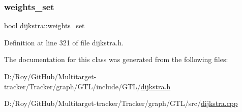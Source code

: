 \subsubsection{\texorpdfstring{weights\+\_\+set}{weights\_set}}
{\footnotesize\ttfamily bool dijkstra\+::weights\+\_\+set\hspace{0.3cm}{\ttfamily [private]}}



Definition at line 321 of file dijkstra.\+h.



The documentation for this class was generated from the following files\+:\begin{DoxyCompactItemize}
\item 
D\+:/\+Roy/\+Git\+Hub/\+Multitarget-\/tracker/\+Tracker/graph/\+G\+T\+L/include/\+G\+T\+L/\mbox{\hyperlink{dijkstra_8h}{dijkstra.\+h}}\item 
D\+:/\+Roy/\+Git\+Hub/\+Multitarget-\/tracker/\+Tracker/graph/\+G\+T\+L/src/\mbox{\hyperlink{dijkstra_8cpp}{dijkstra.\+cpp}}\end{DoxyCompactItemize}
